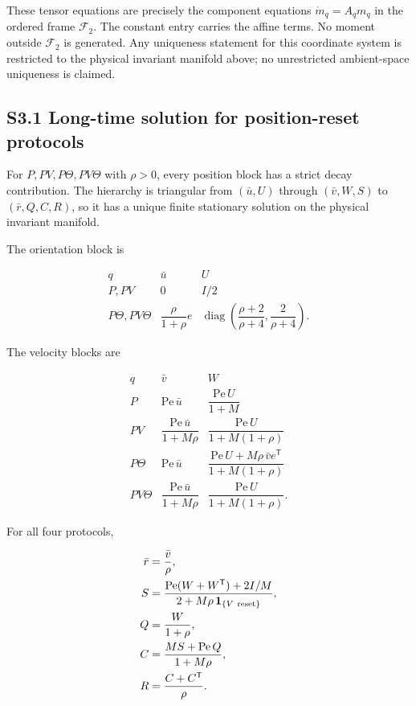 These tensor equations are precisely the component equations \(\dot m_q=A_qm_q\) in the ordered frame \(\mathcal F_2\). The constant entry carries the affine terms. No moment outside \(\mathcal F_2\) is generated. Any uniqueness statement for this coordinate system is restricted to the physical invariant manifold above; no unrestricted ambient-space uniqueness is claimed.

\subsection{S3.1 Long-time solution for position-reset protocols}\label{s3.1-long-time-solution-for-position-reset-protocols}

For \(P,PV,P\Theta,PV\Theta\) with \(\rho>0\), every position block has a strict decay contribution. The hierarchy is triangular from \((\bar u,U)\) through \((\bar v,W,S)\) to \((\bar r,Q,C,R)\), so it has a unique finite stationary solution on the physical invariant manifold.

The orientation block is

\[
\begin{array}{c|cc}
q & \bar u & U\\ \hline
P,PV & 0 & I/2\\[2mm]
P\Theta,PV\Theta
& \dfrac{\rho}{1+\rho}e
& \operatorname{diag}\!\left(\dfrac{\rho+2}{\rho+4},
                              \dfrac{2}{\rho+4}\right).
\end{array}
\]

The velocity blocks are

\[
\begin{array}{c|cc}
q & \bar v & W\\ \hline
P
& \mathrm{Pe}\,\bar u
& \dfrac{\mathrm{Pe}\,U}{1+M}\\[2mm]
PV
& \dfrac{\mathrm{Pe}\,\bar u}{1+M\rho}
& \dfrac{\mathrm{Pe}\,U}{1+M(1+\rho)}\\[2mm]
P\Theta
& \mathrm{Pe}\,\bar u
& \dfrac{\mathrm{Pe}\,U+M\rho\,\bar v e^\mathsf T}
        {1+M(1+\rho)}\\[3mm]
PV\Theta
& \dfrac{\mathrm{Pe}\,\bar u}{1+M\rho}
& \dfrac{\mathrm{Pe}\,U}{1+M(1+\rho)}.
\end{array}
\]

For all four protocols,

\[
\begin{aligned}
\bar r&=\frac{\bar v}{\rho},\\
S&=\frac{\mathrm{Pe}(W+W^\mathsf T)+2I/M}
        {2+M\rho\,\mathbf 1_{\{V\ {\rm reset}\}}},\\
Q&=\frac{W}{1+\rho},\\
C&=\frac{MS+\mathrm{Pe}\,Q}{1+M\rho},\\
R&=\frac{C+C^\mathsf T}{\rho}.
\end{aligned}
\]


